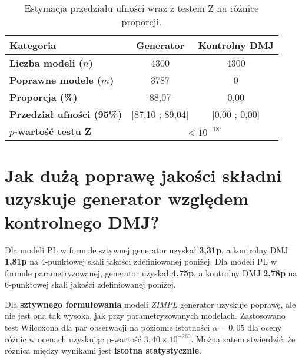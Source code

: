 \begin{table}[H]
\caption{Estymacja przedziału ufności wraz z testem Z na różnice proporcji.}\label{tab:experiment:analysis4}
\centering%
\begin{tabular}{|l|c|c|}
\hline
\textbf{Kategoria} & \textbf{Generator} & \textbf{Kontrolny DMJ} \\
\hline
\textbf{Liczba modeli ($n$)} & 4300 & 4300 \\
\hline
\textbf{Poprawne modele ($m$)} & 3787 & 0 \\
\hline
\textbf{Proporcja (\%)} & 88,07 & 0,00 \\
\hline
\textbf{Przedział ufności (95\%)} & [87,10 ; 89,04] & [0,00 ; 0,00] \\
\hline
\textbf{$p$-wartość testu Z}&\multicolumn{2}{c|}{$<10^{-18}$}\\
\hline
\end{tabular}
\end{table}

\section{Jak dużą poprawę jakości składni uzyskuje generator względem kontrolnego DMJ?}

Dla modeli PL w formule sztywnej generator uzyskał \textbf{3,31p}, a kontrolny DMJ \textbf{1,81p} na 4-punktowej skali jakości zdefiniowanej poniżej. Dla modeli PL w formule parametryzowanej, generator uzyskał \textbf{4,75p}, a kontrolny DMJ \textbf{2,78p} na 6-punktowej skali jakości zdefiniowanej poniżej.

Dla \textbf{sztywnego formułowania} modeli \textit{ZIMPL} generator uzyskuje poprawę, ale nie jest ona tak wysoka, jak przy parametryzowanych modelach. %
Zastosowano test Wilcoxona dla par obserwacji na poziomie istotności $\alpha=0,05$ dla oceny różnic w ocenach uzyskując p-wartość \( 3{,}40 \times 10^{-260} \). Można zatem stwierdzić, że różnica między wynikami jest \textbf{istotna statystycznie}.

